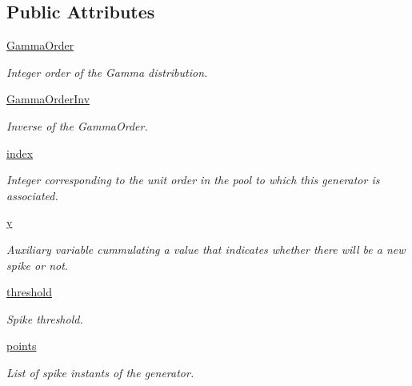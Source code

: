 \subsection*{Public Attributes}
\begin{DoxyCompactItemize}
\item 
\hyperlink{class_point_process_generator_1_1_point_process_generator_aa6c6513cd7f00dbdceb5f945a07cffee}{Gamma\-Order}
\begin{DoxyCompactList}\small\item\em Integer order of the Gamma distribution. \end{DoxyCompactList}\item 
\hyperlink{class_point_process_generator_1_1_point_process_generator_aa70be756b1535ff4512affa05a732fda}{Gamma\-Order\-Inv}
\begin{DoxyCompactList}\small\item\em Inverse of the Gamma\-Order. \end{DoxyCompactList}\item 
\hyperlink{class_point_process_generator_1_1_point_process_generator_a57f6c8af8fd3d37ed8ab2f4abe9be5d8}{index}
\begin{DoxyCompactList}\small\item\em Integer corresponding to the unit order in the pool to which this generator is associated. \end{DoxyCompactList}\item 
\hyperlink{class_point_process_generator_1_1_point_process_generator_a70a43b5c26daf20833ecbc9f4d979726}{y}
\begin{DoxyCompactList}\small\item\em Auxiliary variable cummulating a value that indicates whether there will be a new spike or not. \end{DoxyCompactList}\item 
\hyperlink{class_point_process_generator_1_1_point_process_generator_abcb23e09b752b797a1f11f2679373ca1}{threshold}
\begin{DoxyCompactList}\small\item\em Spike threshold. \end{DoxyCompactList}\item 
\hyperlink{class_point_process_generator_1_1_point_process_generator_ab36d31f34c0330e13ae9732d53984bab}{points}
\begin{DoxyCompactList}\small\item\em List of spike instants of the generator. \end{DoxyCompactList}\end{DoxyCompactItemize}


